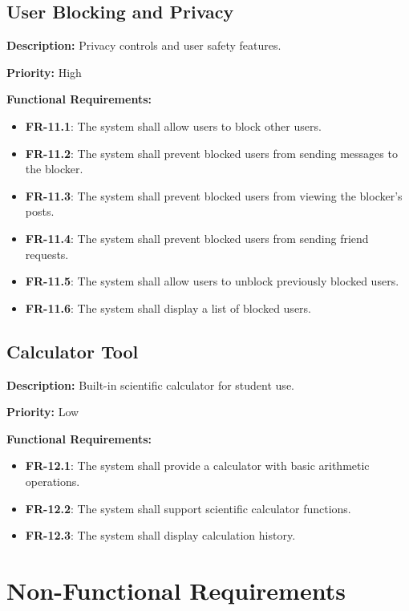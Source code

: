 \documentclass[12pt,a4paper]{article}
\begin{document}
\subsection{User Blocking and Privacy}
\textbf{Description:} Privacy controls and user safety features.

\textbf{Priority:} High

\textbf{Functional Requirements:}

\begin{itemize}
    \item \textbf{FR-11.1}: The system shall allow users to block other users.
    \item \textbf{FR-11.2}: The system shall prevent blocked users from sending messages to the blocker.
    \item \textbf{FR-11.3}: The system shall prevent blocked users from viewing the blocker's posts.
    \item \textbf{FR-11.4}: The system shall prevent blocked users from sending friend requests.
    \item \textbf{FR-11.5}: The system shall allow users to unblock previously blocked users.
    \item \textbf{FR-11.6}: The system shall display a list of blocked users.
\end{itemize}

\subsection{Calculator Tool}
\textbf{Description:} Built-in scientific calculator for student use.

\textbf{Priority:} Low

\textbf{Functional Requirements:}

\begin{itemize}
    \item \textbf{FR-12.1}: The system shall provide a calculator with basic arithmetic operations.
    \item \textbf{FR-12.2}: The system shall support scientific calculator functions.
    \item \textbf{FR-12.3}: The system shall display calculation history.
\end{itemize}

\section{Non-Functional Requirements}
\end{document}
